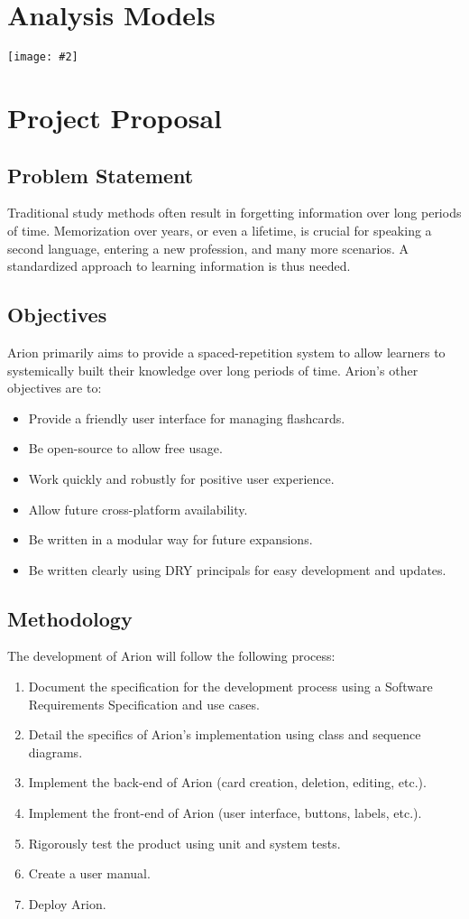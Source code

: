 \documentclass{scrreprt}
\newcommand{\image}[2][1]{
    \begin{center}
        \texttt{[image: \#2]}
    \end{center}
}
\begin{document}
\section{Analysis Models}
\image[0.4]{arion-use-case-diagram}

\section{Project Proposal}

\subsection{Problem Statement}
Traditional study methods often result in forgetting information over long periods of time.
Memorization over years, or even a lifetime, is crucial for
speaking a second language, entering a new profession, and many more scenarios.
A standardized approach to learning information is thus needed.

\subsection{Objectives}
Arion primarily aims to provide a spaced-repetition system to allow learners to 
systemically built their knowledge over long periods of time. Arion's other objectives are to:
\begin{itemize}
    \item Provide a friendly user interface for managing flashcards.
    \item Be open-source to allow free usage.
    \item Work quickly and robustly for positive user experience.
    \item Allow future cross-platform availability.
    \item Be written in a modular way for future expansions.
    \item Be written clearly using DRY principals for easy development and updates.
\end{itemize}

\subsection{Methodology}
The development of Arion will follow the following process:
\begin{enumerate}[1.]
    \item Document the specification for the development process using a Software Requirements Specification and use cases.
    \item Detail the specifics of Arion's implementation using class and sequence diagrams.
    \item Implement the back-end of Arion (card creation, deletion, editing, etc.).
    \item Implement the front-end of Arion (user interface, buttons, labels, etc.).
    \item Rigorously test the product using unit and system tests.
    \item Create a user manual.
    \item Deploy Arion.
\end{enumerate}
\end{document}
